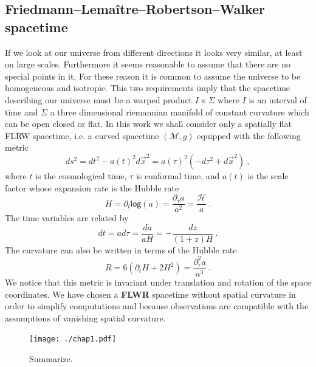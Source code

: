 \documentclass[11pt]{book}
\renewcommand{\log}{\mathsf{log}}
\newcommand{\Hcal}{\mathcal{H}}
\newcommand{\Mcal}{\mathcal{M}}
\theoremstyle{break}
\begin{document}
\subsection{Friedmann--Lemaître--Robertson--Walker spacetime}
\label{p:FLRW}


If we look at our universe from different directions it looks very similar, at least on large scales. Furthermore it seems reasonable to assume that there are no special points in it. For these reason it is common to assume the universe to be homogeneous and isotropic. This two requirements imply that the spacetime describing our universe must be a warped product $I\times \Sigma$ where $I$ is an interval of time and $\Sigma$ a three dimensional riemannian manifold of constant curvature which can be open closed or flat. In this work we shall consider only a spatially flat FLRW spacetime, i.e. a curved spacetime $(\Mcal,g)$ equipped with the following metric
%
\begin{equation*}
ds^2 = dt^2 - a(t)^2 d\vec{x}^2 = a(\tau)^2\left(-d\tau^2+d\vec{x}^2\right) \ ,
\end{equation*}
%
where $t$ is the cosmological time, $\tau$ is conformal time, and $a(t)$ is the scale factor whose expansion rate is the Hubble rate
%
\begin{equation*}
H = \partial_t \log (a) = \frac{\partial_\tau a}{a^2} = \frac{\Hcal}{a} \ .
\end{equation*}
%
The time variables are related by
%
\begin{equation*}
dt = a d\tau = \frac{da}{aH} = -\frac{dz}{(1+z)H} \ . 
\end{equation*}
% 
The curvature can also be written in terms of the Hubble rate
%
\begin{equation}
R=6(\partial_t H + 2 H^2)=\frac{\partial^2_\tau a}{a^3} \ . 
\label{eq:rflrw}
\end{equation}
%
We notice that this metric is invariant under translation and rotation of the space coordinates. We have chosen a \textbf{FLWR} spacetime without spatial curvature in order to simplify computations and because observations are compatible with the assumptions of vanishing spatial curvature. 

\newpage

\begin{figure}
\centering
\texttt{[image: ./chap1.pdf]}
\caption{Summarize.}
\label{fig:chap_1}
\end{figure}
\end{document}
